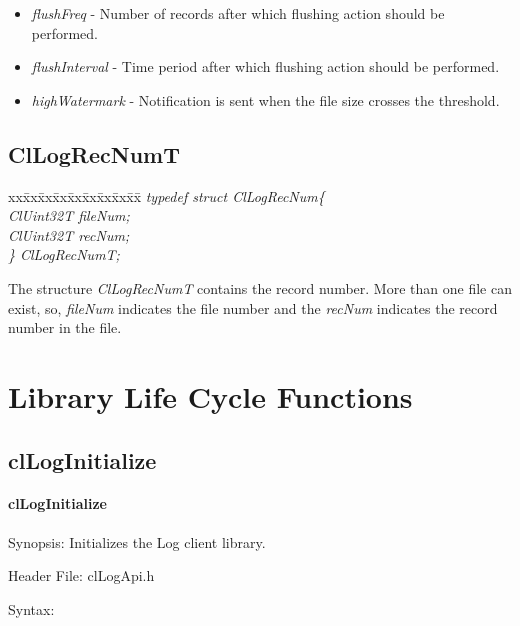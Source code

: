 \begin{flushleft}
\begin{itemize}
\begin{itemize}
\textit{CL\_\-LOG\_\-FILE\_\-FULL\_\-ACTION\_\-ROTATE}, otherwise ignored.
\item \textit{flushFreq} - Number of records after which flushing action should be performed.
\item \textit{flushInterval} - Time period after which flushing action should be performed.
\item \textit{highWatermark} - Notification is sent when the file size crosses the threshold.
\end{itemize}





\subsection{ClLogRecNumT}
\begin{tabbing}
xx\=xx\=xx\=xx\=xx\=xx\=xx\=xx\=xx\=\kill
\textit{typedef struct ClLogRecNum\{}\\
\>\>\>\>\textit{ClUint32T    fileNum;}\\
\>\>\>\>\textit{ClUint32T    recNum;}\\
\textit{\} ClLogRecNumT;}\end{tabbing}
The structure \textit{ClLogRecNumT} contains the record number. More than one file can exist, so, \textit{fileNum} indicates the file number and the
\textit{recNum} indicates the record number in the file.



\newpage
\section{Library Life Cycle Functions}
\subsection{clLogInitialize}
\hypertarget{pagelog101}{}\paragraph{cl\-Log\-Initialize}\label{pagelog101}
\begin{Desc}
\item[Synopsis:]Initializes the Log client library.\end{Desc}
\begin{Desc}
\item[Header File:] clLogApi.h \end{Desc}
\begin{Desc}
\item[Syntax:]


\end{Desc}
\end{itemize}
\end{flushleft}
